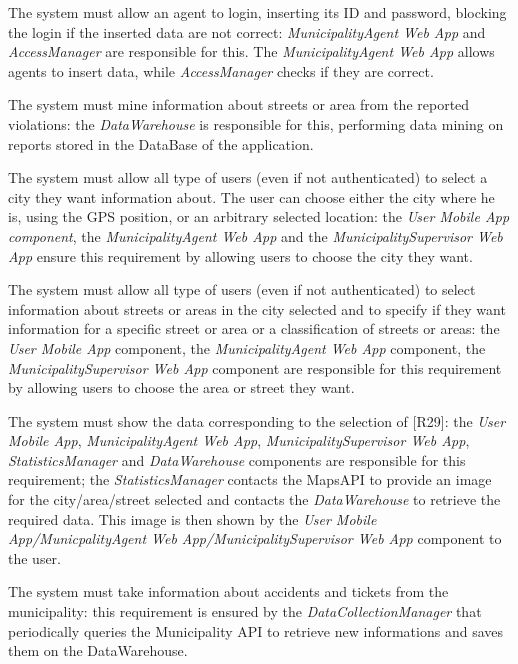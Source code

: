 \documentclass[a4paper]{report}
\begin{document}
\begin{enumerate}[start=1,label={[R\arabic*]}]
\item \label{[R26]}The system must allow an agent to login, inserting its ID and password, blocking the login if the inserted data are not correct: \textit{MunicipalityAgent Web App} and \textit{AccessManager} are responsible for this. The \textit{MunicipalityAgent Web App} allows agents to insert data, while \textit{AccessManager} checks if they are correct.
\item \label{[R27]}The system must mine information about streets or area from the reported violations: the \textit{DataWarehouse} is responsible for this, performing data mining on reports stored in the DataBase of the application.
\item \label{[R28]}The system must allow all type of users (even if not authenticated) to select a city they want information about. The user can choose either the city where he is, using the GPS position, or an arbitrary selected location: the \textit{User Mobile App component}, the \textit{MunicipalityAgent Web App} and the \textit{MunicipalitySupervisor Web App} ensure this requirement by allowing users to choose the city they want.
\item \label{[R29]}The system must allow all type of users (even if not authenticated) to select information about streets or areas in the city selected and to specify if they want information for a specific street or area or a classification of streets or areas: the \textit{User Mobile App} component, the\textit{ MunicipalityAgent Web App} component, the \textit{MunicipalitySupervisor Web App} component are responsible for this requirement by allowing users to choose the area or street they want.
\item \label{[R30]}The system must show the data corresponding to the selection of [R29]: the \textit{User Mobile App}, \textit{MunicipalityAgent Web App}, \textit{MunicipalitySupervisor Web App}, \textit{StatisticsManager} and \textit{DataWarehouse} components are responsible for this requirement; the \textit{StatisticsManager} contacts the MapsAPI to provide an image for the city/area/street selected and contacts the \textit{DataWarehouse} to retrieve the required data. This image is then shown by the \textit{User Mobile App/MunicpalityAgent Web App/MunicipalitySupervisor Web App} component to the user.
\item \label{[R31]}The system must take information about accidents and tickets from the municipality: this requirement is ensured by the \textit{DataCollectionManager} that periodically queries the Municipality API to retrieve new informations and saves them on the DataWarehouse.

\end{enumerate}
\end{document}
